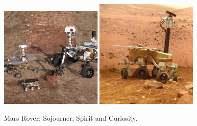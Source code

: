 \begin{description}
\begin{figure}[thpb]
	  \myfloatalign
      \footnotesize
      \centering
    \subfloat
    {  \label{fig:fig_nasa}
        \includegraphics[width=0.45\textwidth]{figures/fig_marsrover.jpg}
    }
    \subfloat
    {  \label{fig:fig_rover}
        \includegraphics[width=0.45\textwidth]{figures/fig_rover.png}
    }     
   \caption[Mars rover]{Mars Rover: Sojourner, Spirit and Curiosity.}
   \label{fig:fig_rover}
\end{figure}


\end{description}

